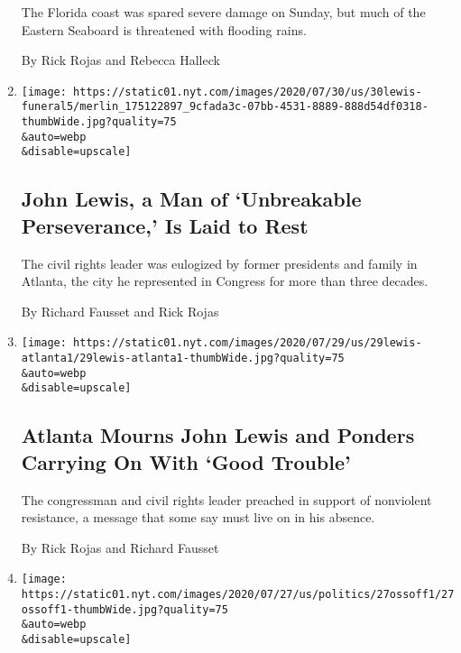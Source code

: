 \begin{enumerate}
  The Florida coast was spared severe damage on Sunday, but much of the
  Eastern Seaboard is threatened with flooding rains.

  By Rick Rojas and Rebecca Halleck
\item
  \href{/2020/07/30/us/john-lewis-live-funeral.html}{}

  \texttt{[image: https://static01.nyt.com/images/2020/07/30/us/30lewis-funeral5/merlin\_175122897\_9cfada3c-07bb-4531-8889-888d54df0318-thumbWide.jpg?quality=75\\\&auto=webp\\\&disable=upscale]}

  \hypertarget{john-lewis-a-man-of-unbreakable-perseverance-is-laid-to-rest}{%
  \subsection{John Lewis, a Man of `Unbreakable Perseverance,' Is Laid
  to
  Rest}\label{john-lewis-a-man-of-unbreakable-perseverance-is-laid-to-rest}}

  The civil rights leader was eulogized by former presidents and family
  in Atlanta, the city he represented in Congress for more than three
  decades.

  By Richard Fausset and Rick Rojas
\item
  \href{/2020/07/29/us/john-lewis-atlanta-memorial.html}{}

  \texttt{[image: https://static01.nyt.com/images/2020/07/29/us/29lewis-atlanta1/29lewis-atlanta1-thumbWide.jpg?quality=75\\\&auto=webp\\\&disable=upscale]}

  \hypertarget{atlanta-mourns-john-lewis-and-ponders-carrying-on-with-good-trouble}{%
  \subsection{Atlanta Mourns John Lewis and Ponders Carrying On With
  `Good
  Trouble'}\label{atlanta-mourns-john-lewis-and-ponders-carrying-on-with-good-trouble}}

  The congressman and civil rights leader preached in support of
  nonviolent resistance, a message that some say must live on in his
  absence.

  By Rick Rojas and Richard Fausset
\item
  \href{/2020/07/27/us/politics/jon-ossoff-david-perdue-ad.html}{}

  \texttt{[image: https://static01.nyt.com/images/2020/07/27/us/politics/27ossoff1/27ossoff1-thumbWide.jpg?quality=75\\\&auto=webp\\\&disable=upscale]}

  \hypertarget{georgia-senator-is-criticized-for-ad-enlarging-jewish-opponents-nose}{%
}
\end{enumerate}
